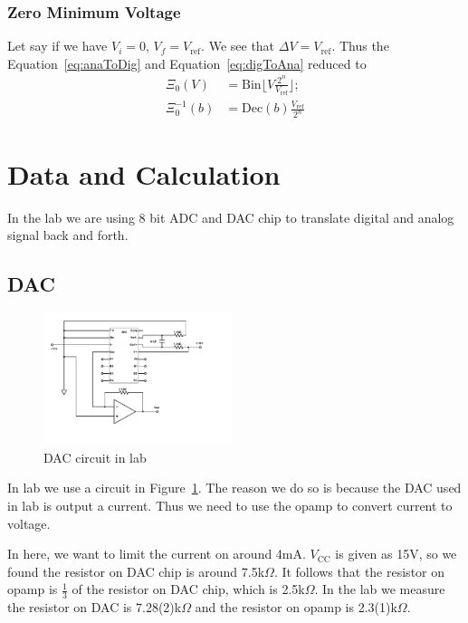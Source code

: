 \documentclass[aps,prl,reprint]{revtex4-1}
\newcommand{\vcc}{V_\text{CC}}
\begin{document}
    \subsubsection{Zero Minimum Voltage}
        Let say if we have $V_i = 0$, $V_f = V_\text{ref}$. We see that $\Delta V = V_\text{ref}$. Thus the Equation~\ref{eq:anaToDig} and Equation~\ref{eq:digToAna} reduced to
        \begin{align}
            \Xi_0 (V) &= \text{Bin}\lfloor V\frac{2^n}{V_\text{ref}} \rfloor; \label{eq:anaToDig.zero}\\ 
            \Xi^{-1}_0 (b)&= \text{Dec}(b) \frac{V_\text{ref}}{2^n} \label{eq:digToAna.zero}
        \end{align}
\section{Data and Calculation}
    In the lab we are using 8 bit ADC and DAC chip to translate digital and analog signal back and forth.
    \subsection{DAC}
        \begin{figure}[h]
            \centering
            \includegraphics[width=0.49\textwidth]{image/DAC.pdf}
            \caption{DAC circuit in lab}
            \label{fig:dac}
        \end{figure}
        In lab we use a circuit in Figure~\ref{fig:dac}. The reason we do so is because the DAC used in lab is output a current. Thus we need to use the opamp to convert current to voltage. 

        In here, we want to limit the current on around 4mA. $\vcc$ is given as 15V, so we found the resistor on DAC chip is around 7.5k$\Omega$. It follows that the resistor on opamp is $\frac{1}{3}$ of the resistor on DAC chip, which is 2.5k$\Omega$. In the lab we measure the resistor on DAC is 7.28(2)k$\Omega$ and the resistor on opamp is 2.3(1)k$\Omega$.
\end{document}
